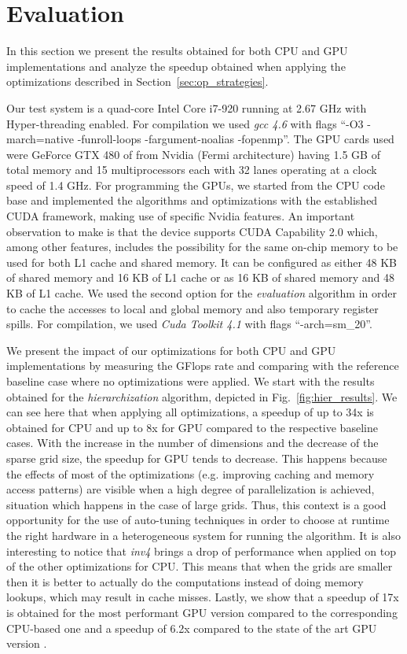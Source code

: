 \section{Evaluation}

In this section we present the results obtained for both CPU and GPU
implementations and analyze the speedup obtained when applying the
optimizations described in Section~\ref{sec:op_strategies}.

Our test system is a quad-core Intel Core i7-920 running at 2.67 GHz with
Hyper-threading enabled. For compilation we used \textit{gcc 4.6} with flags
``-O3 -march=native -funroll-loops -fargument-noalias -fopenmp''. The GPU cards
used were GeForce GTX 480 of from Nvidia (Fermi architecture) having 1.5 GB of
total memory and 15 multiprocessors each with 32 lanes operating at a clock
speed of 1.4 GHz. For programming the GPUs, we started from the CPU code base
and implemented the algorithms and optimizations with the established CUDA
framework, making use of specific Nvidia features. An important observation to
make is that the device supports CUDA Capability 2.0 which, among other
features, includes the possibility for the same on-chip memory to be used for
both L1 cache and shared memory. It can be configured as either 48 KB of shared
memory and 16 KB of L1 cache or as 16 KB of shared memory and 48 KB of L1 cache.
We used the second option for the \textit{evaluation} algorithm in order to
cache the accesses to local and global memory and also temporary register
spills. For compilation, we used \textit{Cuda Toolkit 4.1} with flags
``-arch=sm\_20''.

We present the impact of our optimizations for both CPU and GPU implementations
by measuring the GFlops rate and comparing with the reference baseline case
where no optimizations were applied. We start with the results obtained for the
\textit{hierarchization} algorithm, depicted in Fig.~\ref{fig:hier_results}. We
can see here that when applying all optimizations, a speedup of up to 34x is
obtained for CPU and up to 8x for GPU compared to the respective baseline cases.
With the increase in the number of dimensions and the decrease of the sparse
grid size, the speedup for GPU tends to decrease. This happens because the
effects of most of the optimizations (e.g. improving caching and memory access
patterns) are visible when a high degree of parallelization is achieved,
situation which happens in the case of large grids. Thus, this context is a good
opportunity for the use of auto-tuning techniques in order to choose at runtime
the right hardware in a heterogeneous system for running the algorithm. It is
also interesting to notice that \textit{inv4} brings a drop of performance when
applied on top of the other optimizations for CPU. This means that when the
grids are smaller then it is better to actually do the computations instead of
doing memory lookups, which may result in cache misses. Lastly, we show that a
speedup of 17x is obtained for the most performant GPU version compared to the
corresponding CPU-based one and a speedup of 6.2x compared to the state of the
art GPU version \cite{Murarasu:2011:CDS:1941553.1941559}.

